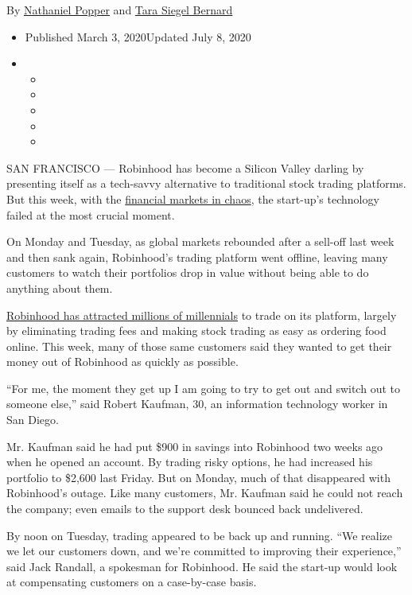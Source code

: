 By
\href{https://www.nytimes3xbfgragh.onion/by/nathaniel-popper}{Nathaniel
Popper} and
\href{https://www.nytimes3xbfgragh.onion/by/tara-siegel-bernard}{Tara
Siegel Bernard}

\begin{itemize}
\item
  Published March 3, 2020Updated July 8, 2020
\item
  \begin{itemize}
  \item
  \item
  \item
  \item
  \item
  \end{itemize}
\end{itemize}

SAN FRANCISCO --- Robinhood has become a Silicon Valley darling by
presenting itself as a tech-savvy alternative to traditional stock
trading platforms. But this week, with the
\href{https://www.nytimes3xbfgragh.onion/2020/02/27/business/stock-market-coronavirus.html}{financial
markets in chaos}, the start-up's technology failed at the most crucial
moment.

On Monday and Tuesday, as global markets rebounded after a sell-off last
week and then sank again, Robinhood's trading platform went offline,
leaving many customers to watch their portfolios drop in value without
being able to do anything about them.

\href{https://www.nytimes3xbfgragh.onion/2020/07/08/technology/robinhood-risky-trading.html}{Robinhood
has attracted millions of millennials} to trade on its platform, largely
by eliminating trading fees and making stock trading as easy as ordering
food online. This week, many of those same customers said they wanted to
get their money out of Robinhood as quickly as possible.

``For me, the moment they get up I am going to try to get out and switch
out to someone else,'' said Robert Kaufman, 30, an information
technology worker in San Diego.

Mr. Kaufman said he had put \$900 in savings into Robinhood two weeks
ago when he opened an account. By trading risky options, he had
increased his portfolio to \$2,600 last Friday. But on Monday, much of
that disappeared with Robinhood's outage. Like many customers, Mr.
Kaufman said he could not reach the company; even emails to the support
desk bounced back undelivered.

By noon on Tuesday, trading appeared to be back up and running. ``We
realize we let our customers down, and we're committed to improving
their experience,'' said Jack Randall, a spokesman for Robinhood. He
said the start-up would look at compensating customers on a case-by-case
basis.

